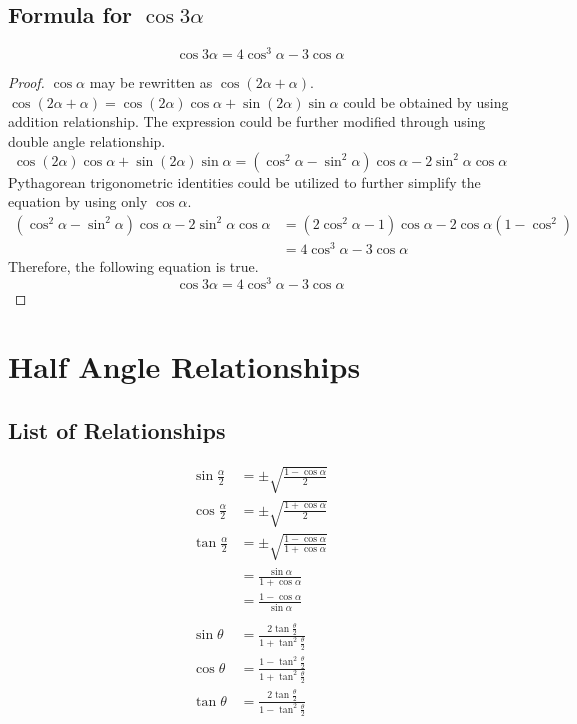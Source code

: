 \documentclass{article}
\begin{document}
\subsection{Formula for $\cos3\alpha$}
    \[
    \cos3\alpha=4\cos^3\alpha-3\cos\alpha
    \]
\begin{proof}
    $\cos\alpha$ may be rewritten as $\cos(2\alpha+\alpha)$. $\cos(2\alpha+\alpha)=\cos(2\alpha)\cos\alpha+\sin(2\alpha)\sin\alpha$ could be obtained by using addition relationship. The expression could be further modified through using double angle relationship.
    \[
    \cos(2\alpha)\cos\alpha+\sin(2\alpha)\sin\alpha=(\cos^2\alpha-\sin^2\alpha)\cos\alpha-2\sin^2\alpha\cos\alpha
    \]
    Pythagorean trigonometric identities could be utilized to further simplify the equation by using only $\cos\alpha$.
    \begin{align*}
    (\cos^2\alpha-\sin^2\alpha)\cos\alpha-2\sin^2\alpha\cos\alpha&=(2\cos^2\alpha-1)\cos\alpha-2\cos\alpha(1-\cos^2) \\
    &=4\cos^3\alpha-3\cos\alpha
    \end{align*}
    Therefore, the following equation is true.
    \[
    \cos3\alpha=4\cos^3\alpha-3\cos\alpha
    \]
\end{proof}


\section{Half Angle Relationships}
\subsection{List of Relationships}
\begin{align*}
    \sin\frac{\alpha}{2}&=\pm\sqrt{\frac{1-\cos\alpha}{2}} \\
    \cos\frac{\alpha}{2}&=\pm\sqrt{\frac{1+\cos\alpha}{2}} \\
    \tan\frac{\alpha}{2}&=\pm\sqrt{\frac{1-\cos\alpha}{1+\cos\alpha}} \\
    &=\frac{\sin\alpha}{1+\cos\alpha} \\
    &=\frac{1-\cos\alpha}{\sin\alpha}
    \\\\
    \sin\theta&=\frac{2\tan\frac{\theta}{2}}{1+\tan^2\frac{\theta}{2}} \\
    \cos\theta&=\frac{1-\tan^2\frac{\theta}{2}}{1+\tan^2\frac{\theta}{2}} \\
    \tan\theta&=\frac{2\tan\frac{\theta}{2}}{1-\tan^2\frac{\theta}{2}}
\end{align*}
\end{document}
